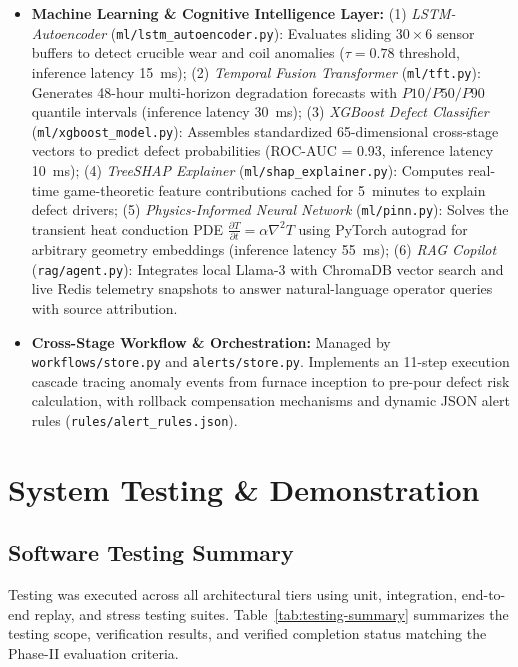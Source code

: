 \documentclass[11pt, a4paper]{article}
\begin{document}
\begin{itemize}[noitemsep, topsep=2pt]
    (3) \textit{Molding Twin} (\texttt{digital\_twins/molding.py}) monitors green sand compactability, permeability, and moisture, exposing \texttt{MoldingState};
    (4) \textit{Quality Twin} (\texttt{digital\_twins/quality.py}) aggregates pre-pour defect probabilities with optical surface inspection results (ResNet-50), exposing \texttt{QualityState}.
    \item \textbf{Machine Learning \& Cognitive Intelligence Layer:}
    (1) \textit{LSTM-Autoencoder} (\texttt{ml/lstm\_autoencoder.py}): Evaluates sliding $30 \times 6$ sensor buffers to detect crucible wear and coil anomalies ($\tau = 0.78$ threshold, inference latency 15~ms);
    (2) \textit{Temporal Fusion Transformer} (\texttt{ml/tft.py}): Generates 48-hour multi-horizon degradation forecasts with $P10/P50/P90$ quantile intervals (inference latency 30~ms);
    (3) \textit{XGBoost Defect Classifier} (\texttt{ml/xgboost\_model.py}): Assembles standardized 65-dimensional cross-stage vectors to predict defect probabilities (ROC-AUC = 0.93, inference latency 10~ms);
    (4) \textit{TreeSHAP Explainer} (\texttt{ml/shap\_explainer.py}): Computes real-time game-theoretic feature contributions cached for 5~minutes to explain defect drivers;
    (5) \textit{Physics-Informed Neural Network} (\texttt{ml/pinn.py}): Solves the transient heat conduction PDE $\frac{\partial T}{\partial t} = \alpha \nabla^2 T$ using PyTorch autograd for arbitrary geometry embeddings (inference latency 55~ms);
    (6) \textit{RAG Copilot} (\texttt{rag/agent.py}): Integrates local Llama-3 with ChromaDB vector search and live Redis telemetry snapshots to answer natural-language operator queries with source attribution.
    \item \textbf{Cross-Stage Workflow \& Orchestration:} Managed by \texttt{workflows/store.py} and \texttt{alerts/store.py}. Implements an 11-step execution cascade tracing anomaly events from furnace inception to pre-pour defect risk calculation, with rollback compensation mechanisms and dynamic JSON alert rules (\texttt{rules/alert\_rules.json}).
\end{itemize}

\section{System Testing \& Demonstration}

\subsection{Software Testing Summary}
\noindent
Testing was executed across all architectural tiers using unit, integration, end-to-end replay, and stress testing suites. Table~\ref{tab:testing-summary} summarizes the testing scope, verification results, and verified completion status matching the Phase-II evaluation criteria.
\end{document}
